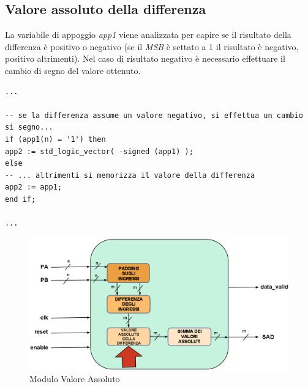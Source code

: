 \documentclass[12pt, a4paper]{article}
\begin{document}
\subsection{Valore assoluto della differenza}
La variabile di appoggio \textit{app1} viene analizzata per capire se il risultato della differenza è positivo o negativo (se il \textit{MSB} è settato a 1 il risultato è negativo, positivo altrimenti). Nel caso di risultato negativo è necessario effettuare il cambio di segno del valore ottenuto.
{\fontsize{8}{8}
\begin{verbatim}
...

-- se la differenza assume un valore negativo, si effettua un cambio si segno...
if (app1(n) = '1') then
app2 := std_logic_vector( -signed (app1) );
else 		
-- ... altrimenti si memorizza il valore della differenza
app2 := app1;
end if;

...
\end{verbatim}
}
\begin{figure}[h!]
\centering
\includegraphics[scale=0.3]{images/abs.eps}
\caption{Modulo Valore Assoluto}\label{fig:6}
\end{figure}
\newpage
\end{document}

